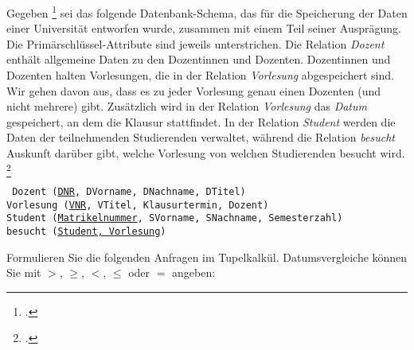 \documentclass{bschlangaul-aufgabe}
\begin{document}

Gegeben \footcite[Thema 2 Teilaufgabe 1 Aufgabe 4
Seite 12-13]{examen:66116:2018:03} sei das folgende Datenbank-Schema,
das für die Speicherung der Daten einer Universität entworfen wurde,
zusammen mit einem Teil seiner Ausprägung. Die Primärschlüssel-Attribute
sind jeweils unterstrichen. Die Relation \emph{Dozent} enthält
allgemeine Daten zu den Doz\-entinnen und Dozenten. Dozentinnen und
Dozenten halten Vorlesungen, die in der Relation \emph{Vorlesung}
abgespeichert sind. Wir gehen davon aus, dass es zu jeder Vorlesung
genau einen Dozenten (und nicht mehrere) gibt. Zusätzlich wird in der
Relation \emph{Vorlesung} das \emph{Datum} gespeichert, an dem die
Klausur stattfindet. In der Relation \emph{Student} werden die Daten der
teilnehmenden Studierenden verwaltet, während die Relation
\emph{besucht} Auskunft darüber gibt, welche Vorlesung von welchen
Studierenden besucht wird.
\footcite[Seite 4-5]{db:ab:3}

\begin{mdframed}
\tt
Dozent (\underline{DNR}, DVorname, DNachname, DTitel)\\
Vorlesung (\underline{VNR}, VTitel, Klausurtermin, Dozent)\\
Student (\underline{Matrikelnummer}, SVorname, SNachname, Semesterzahl)\\
besucht (\underline{Student, Vorlesung})
\end{mdframed}

Formulieren Sie die folgenden Anfragen im Tupelkalkül. Datumsvergleiche
können Sie mit $>$, $\geq$, $<$, $\leq$ oder $=$ angeben:
\end{document}
